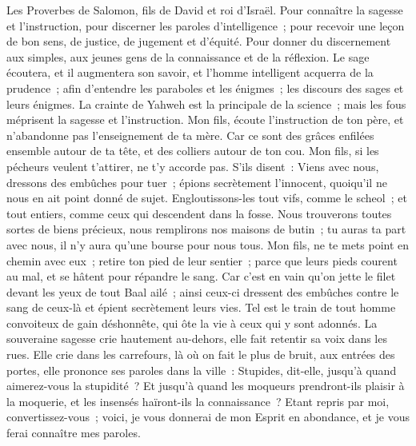 \begin{multicols}{2}
\VerseOne{}Les Proverbes de Salomon, fils de David et roi d'Israël.
Pour connaître la sagesse et l'instruction, pour discerner les paroles d'intelligence~;
pour recevoir une leçon de bon sens, de justice, de jugement et d'équité.
Pour donner du discernement aux simples, aux jeunes gens de la connaissance et de la réflexion.
Le sage écoutera, et il augmentera son savoir, et l'homme intelligent acquerra de la prudence~;
afin d'entendre les paraboles et les énigmes~; les discours des sages et leurs énigmes.
La crainte de Yahweh est la principale de la science~; mais les fous méprisent la sagesse et l'instruction.
Mon fils, écoute l'instruction de ton père, et n'abandonne pas l'enseignement de ta mère.
Car ce sont des grâces enfilées ensemble autour de ta tête, et des colliers autour de ton cou.
Mon fils, si les pécheurs veulent t'attirer, ne t'y accorde pas.
S'ils disent~: Viens avec nous, dressons des embûches pour tuer~; épions secrètement l'innocent, quoiqu'il ne nous en ait point donné de sujet.
Engloutissons-les tout vifs, comme le scheol~; et tout entiers, comme ceux qui descendent dans la fosse.
Nous trouverons toutes sortes de biens précieux, nous remplirons nos maisons de butin~;
tu auras ta part avec nous, il n'y aura qu'une bourse pour nous tous.
Mon fils, ne te mets point en chemin avec eux~; retire ton pied de leur sentier~;
parce que leurs pieds courent au mal, et se hâtent pour répandre le sang.
Car c'est en vain qu'on jette le filet devant les yeux de tout Baal ailé~;
ainsi ceux-ci dressent des embûches contre le sang de ceux-là et épient secrètement leurs vies.
Tel est le train de tout homme convoiteux de gain déshonnête, qui ôte la vie à ceux qui y sont adonnés.
La souveraine sagesse crie hautement au-dehors, elle fait retentir sa voix dans les rues.
Elle crie dans les carrefours, là où on fait le plus de bruit, aux entrées des portes, elle prononce ses paroles dans la ville~:
Stupides, dit-elle, jusqu'à quand aimerez-vous la stupidité~? Et jusqu'à quand les moqueurs prendront-ils plaisir à la moquerie, et les insensés haïront-ils la connaissance~?
Etant repris par moi, convertissez-vous~; voici, je vous donnerai de mon Esprit en abondance, et je vous ferai connaître mes paroles.

\end{multicols}
